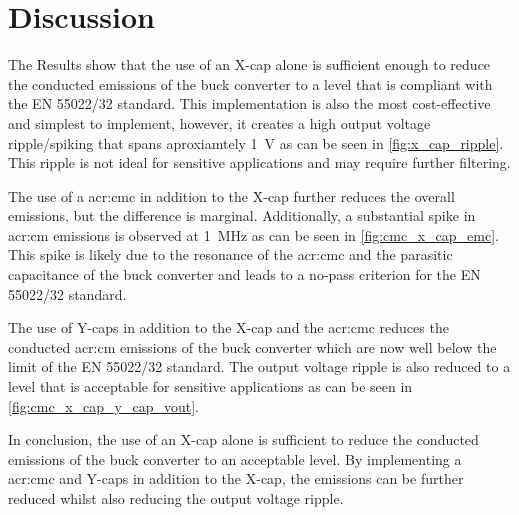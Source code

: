 \chapter{Discussion}
\label{chapter:discussion}

The Results show that the use of an X-cap alone is sufficient enough to reduce the conducted emissions of the buck converter to a level that is compliant with the EN 55022/32 standard. This implementation is also the most cost-effective and simplest to implement, however, it creates a high output voltage ripple/spiking that spans aproxiamtely \qty{1}{\volt} as can be seen in \autoref{fig:x_cap_ripple}. This ripple is not ideal for sensitive applications and may require further filtering.

The use of a \gls{acr:cmc} in addition to the X-cap further reduces the overall emissions, but the difference is marginal. Additionally, a substantial spike in \gls{acr:cm} emissions is observed at \qty{1}{\mega\hertz} as can be seen in \autoref{fig:cmc_x_cap_emc}. This spike is likely due to the resonance of the \gls{acr:cmc} and the parasitic capacitance of the buck converter and leads to a no-pass criterion for the EN 55022/32 standard.

The use of Y-caps in addition to the X-cap and the \gls{acr:cmc} reduces the conducted \gls{acr:cm} emissions of the buck converter which are now well below the limit of the EN 55022/32 standard. The output voltage ripple is also reduced to a level that is acceptable for sensitive applications as can be seen in \autoref{fig:cmc_x_cap_y_cap_vout}.

In conclusion, the use of an X-cap alone is sufficient to reduce the conducted emissions of the buck converter to an acceptable level. 
By implementing a \gls{acr:cmc} and Y-caps in addition to the X-cap, the emissions can be further reduced whilst also reducing the output voltage ripple.


